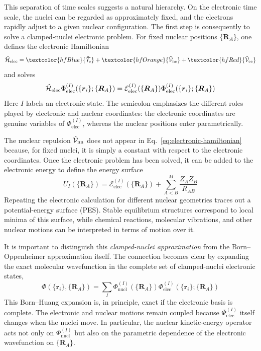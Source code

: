 \documentclass[11pt,a4paper,titlepage]{article}
\numberwithin{equation}{section}
\newcommand{\br}{\boldsymbol{r}}
\newcommand{\bR}{\boldsymbol{R}}
\newcommand{\chH}{\Hat{\mathcal{H}}}
\newcommand{\chT}{\Hat{\mathcal{T}}}
\newcommand{\chV}{\Hat{\mathcal{V}}}
\newcommand{\cE}{\mathcal{E}}
\newcommand{\red}[1]{\textcolor{hfRed}{#1}}
\newcommand{\orange}[1]{\textcolor{hfOrange}{#1}}
\newcommand{\blue}[1]{\textcolor{hfBlue}{#1}}
\begin{document}
This separation of time scales suggests a natural hierarchy. On the
electronic time scale, the nuclei can be regarded as approximately fixed, and
the electrons rapidly adjust to a given nuclear configuration. The first step
is consequently to solve a clamped-nuclei electronic problem. For fixed
nuclear positions $\{\bR_A\}$, one defines the electronic Hamiltonian
\begin{equation}
  \chH_\text{elec}
  =
  \blue{\chT_\text{e}}
  +
  \orange{\chV_\text{ne}}
  +
  \red{\chV_\text{ee}}
  \label{eq:electronic-hamiltonian}
\end{equation}
and solves
\begin{equation}
  \chH_\text{elec}
  \Phi_\text{elec}^{(I)}
  (\{\br_i\};\{\bR_A\})
  =
  \cE_\text{elec}^{(I)}(\{\bR_A\})
  \Phi_\text{elec}^{(I)}
  (\{\br_i\};\{\bR_A\})
  \label{eq:clamped-nuclei}
\end{equation}
Here $I$ labels an electronic state. The semicolon emphasizes the different
roles played by electronic and nuclear
coordinates: the electronic coordinates are genuine variables of
$\Phi_\text{elec}^{(I)}$, whereas the nuclear positions enter
parametrically.

The nuclear repulsion $\chV_\text{nn}$ does not appear in
Eq.~\eqref{eq:electronic-hamiltonian} because, for fixed nuclei, it is simply
a constant with respect to the electronic coordinates. Once the electronic
problem has been solved, it can be added to the electronic energy to define
the energy surface
\begin{equation}
  U_I(\{\bR_A\})
  =
  \cE_\text{elec}^{(I)}(\{\bR_A\})
  +
  \sum_{A<B}^{M}
  \frac{Z_A Z_B}{R_{AB}}
  \label{eq:potential-energy-surface}
\end{equation}
Repeating the electronic calculation for different nuclear geometries traces
out a potential-energy surface (PES). Stable equilibrium structures correspond
to local minima of this surface, while chemical reactions, molecular
vibrations, and other nuclear motions can be interpreted in terms of motion
over it.

It is important to distinguish this \emph{clamped-nuclei approximation} from
the Born--Oppenheimer approximation itself. The connection becomes clear by
expanding the exact molecular wavefunction in the complete set of
clamped-nuclei electronic states,
\begin{equation}
  \Phi(\{\br_i\},\{\bR_A\})
  =
  \sum_I
  \Phi_\text{nucl}^{(I)}(\{\bR_A\})
  \Phi_\text{elec}^{(I)}
  (\{\br_i\};\{\bR_A\})
  \label{eq:born-huang-expansion}
\end{equation}
This Born--Huang expansion is, in principle, exact if the electronic basis is
complete. The electronic and nuclear motions remain coupled because
$\Phi_\text{elec}^{(I)}$ itself changes when the nuclei move. In particular,
the nuclear kinetic-energy operator acts not only on
$\Phi_\text{nucl}^{(I)}$ but also on the parametric dependence of the
electronic wavefunction on $\{\bR_A\}$.
\end{document}
